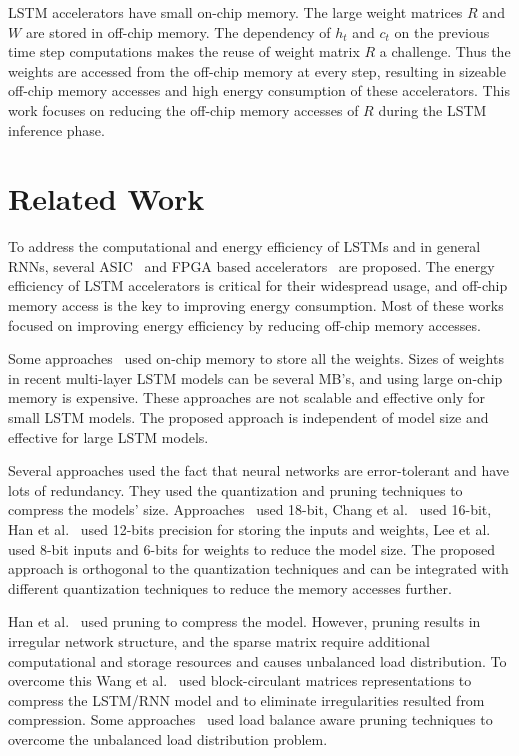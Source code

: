 LSTM accelerators have small on-chip memory. The large weight matrices $R$ and $W$ are stored in off-chip memory. The dependency of $h_{t}$ and $c_{t}$ on the previous time step computations makes the reuse of weight matrix $R$ a challenge. Thus the weights are accessed from the off-chip memory at every step, resulting in sizeable off-chip memory accesses and high energy consumption of these accelerators. This work focuses on reducing the off-chip memory accesses of $R$ during the LSTM inference phase.
\section{Related Work}
To address the computational and energy efficiency of LSTMs and in general RNNs, several ASIC~\cite{conti2018chipmunk,wang2017accelerating,azari2020elsa} and FPGA based accelerators~\cite{chang2015recurrent,ferreira2016fpga,lee2016fpga,guan2017fpga,han2017ese} are proposed. The energy efficiency of LSTM accelerators is critical for their widespread usage, and off-chip memory access is the key to improving energy consumption. Most of these works focused on improving energy efficiency by reducing off-chip memory accesses.

Some approaches~\cite{lee2016fpga, rybalkin2018finn, ferreira2016fpga} used on-chip memory to store all the weights. Sizes of weights in recent multi-layer LSTM models can be several MB's, and using large on-chip memory is expensive. These approaches are not scalable and effective only for small LSTM models. The proposed approach is independent of model size and effective for large LSTM models.

Several approaches used the fact that neural networks are error-tolerant and have lots of redundancy. They used the quantization and pruning techniques to compress the models' size. Approaches~\cite{ferreira2016fpga,wang2018c} used 18-bit, Chang et al.~\cite{chang2015recurrent} used 16-bit, Han et al.~\cite{han2017ese} used 12-bits precision for storing the inputs and weights, Lee et al.~\cite{lee2016fpga} used 8-bit inputs and 6-bits for weights to reduce the model size. The proposed approach is orthogonal to the quantization techniques and can be integrated with different quantization techniques to reduce the memory accesses further. 

Han et al.~\cite{han2017ese} used pruning to compress the model. However, pruning results in irregular network structure, and the sparse matrix require additional computational and storage resources and causes unbalanced load distribution. To overcome this Wang et al.~\cite{wang2018c} used block-circulant matrices representations to compress the LSTM/RNN model and to eliminate irregularities resulted from compression. Some approaches~\cite{park2019balancing,han2017ese,park2018maximizing} used load balance aware pruning techniques to overcome the unbalanced load distribution problem. 

